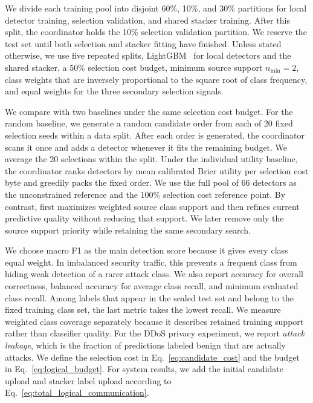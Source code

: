 

 We divide each training pool into disjoint 60\%, 10\%,
and 30\% partitions for local detector training, selection validation, and
shared stacker training. After this split, the coordinator holds the 10\%
selection validation partition. We reserve the test set until both selection
and stacker fitting
have finished. Unless stated otherwise, we use five repeated
splits, LightGBM~\cite{lightgbm} for local detectors and the shared stacker, a
50\% selection cost budget, minimum source support $n_{\min}=2$, class weights
that are inversely proportional to the square root of class frequency, and
equal weights for the three secondary selection signals.

 We compare \Fname with two baselines
under the same selection cost budget. For the random baseline, we generate a
random candidate order from each of 20 fixed selection seeds within a data
split. After each order is generated, the coordinator scans it once and adds a
detector whenever it fits the remaining budget. We average the 20 selections
within the split. Under the individual utility baseline, the coordinator ranks detectors by mean
calibrated Brier utility per selection cost byte and greedily packs the fixed
order. We use the full pool of 66 detectors as the unconstrained reference and
the 100\% selection cost reference point.
By contrast, \Fname first maximizes weighted source class support and then
refines current predictive quality without reducing that support. We later
remove only the source support priority while retaining the same secondary
search.

 We choose macro F1 as the main detection
score because it gives every class equal weight. In imbalanced security
traffic, this prevents a frequent class from hiding weak detection of a rarer
attack class. We also report accuracy for overall correctness, balanced
accuracy for average class recall, and minimum evaluated class recall. Among
labels that appear in the sealed test set and belong to the fixed training
class set, the last metric takes the lowest recall. We measure
weighted class coverage separately because it describes retained training
support rather than classifier quality. For the DDoS privacy experiment, we
report \emph{attack leakage}, which is the fraction of predictions labeled
benign that are actually attacks. We define the selection cost in
Eq.~\ref{eq:candidate_cost} and the budget in
Eq.~\ref{eq:logical_budget}. For system results, we add the initial
candidate upload and stacker label upload according to
Eq.~\ref{eq:total_logical_communication}.

